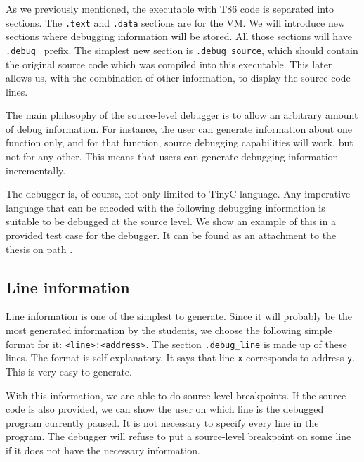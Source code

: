 As we previously mentioned, the executable with T86 code is separated into
sections. The \texttt{.text} and \texttt{.data} sections are for the VM. We
will introduce new sections where debugging information will be stored. All
those sections will have \verb|.debug_| prefix. The simplest new section is
\verb|.debug_source|, which should contain the original source code which was
compiled into this executable. This later allows us, with the combination of
other information, to display the source code lines.

The main philosophy of the source-level debugger is to allow an arbitrary
amount of debug information. For instance, the user can generate information
about one function only, and for that function, source debugging capabilities
will work, but not for any other. This means that users can generate debugging
information incrementally.

The debugger is, of course, not only limited to TinyC language. Any imperative
language that can be encoded with the following debugging information is
suitable to be debugged at the source level. We show an example of this in a
provided test case for the debugger. It can be found as an attachment to the
thesis on path .

\subsection{Line information}
Line information is one of the simplest to generate. Since it will probably be
the most generated information by the students, we choose the following simple
format for it: \texttt{<line>:<address>}. The section \verb|.debug_line| is
made up of these lines. The format is self-explanatory. It says that line
\texttt{x} corresponds to address \texttt{y}. This is very easy to generate.

With this information, we are able to do source-level breakpoints. If the
source code is also provided, we can show the user on which line is the
debugged program currently paused. It is not necessary to specify every line in
the program. The debugger will refuse to put a source-level breakpoint on some
line if it does not have the necessary information.

